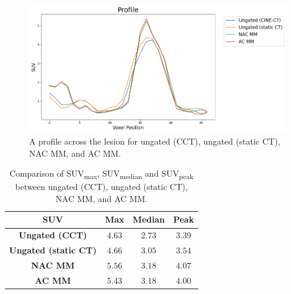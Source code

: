             \begin{figure}
                \centering
                
                \includegraphics[width=1.0\linewidth]{figures/motion_correction_1_results_2_profile.png}
                
                \captionsetup{singlelinecheck=false}
                \caption{
                    A profile across the lesion for ungated (\gls{CCT}), ungated (static \gls{CT}), \gls{NAC} \gls{MM}, and \gls{AC} \gls{MM}.
                }
                \label{fig:pet_ct_respiratory_motion_correction_with_a_single_attenuation_map_using_nac_derived_deformation_fields_results_profile}
            \end{figure}
            
            \begin{table}
                \centering
                
                \captionsetup{singlelinecheck=false}
                \caption{
                    Comparison of \gls{SUV}\textsubscript{max}, \gls{SUV}\textsubscript{median} and \gls{SUV}\textsubscript{peak} between ungated (\gls{CCT}), ungated (static \gls{CT}), \gls{NAC} \gls{MM}, and \gls{AC} \gls{MM}.
                }
                
                \resizebox*{1.0\linewidth}{!}
                {
                    \begin{tabular}{||c|ccc||}
                        \hline
                        \textbf{\gls{SUV}}                  & \textbf{Max}  & \textbf{Median}   & \textbf{Peak} \\
                        \hline
                        \textbf{Ungated (\gls{CCT})}        & $4.63$        & $2.73$                     & $3.39$ \\
                        \textbf{Ungated (static \gls{CT})}  & $4.66$        & $3.05$                     & $3.54$ \\
                        \hline
                        \textbf{\gls{NAC} \gls{MM}}         & $5.56$        & $3.18$                     & $4.07$ \\
                        \textbf{\gls{AC} \gls{MM}}          & $5.43$        & $3.18$                     & $4.00$ \\
                        \hline
                    \end{tabular}
                }
                \label{tab:pet_ct_respiratory_motion_correction_with_a_single_attenuation_map_using_nac_derived_deformation_fields_results_suv}
            \end{table}

